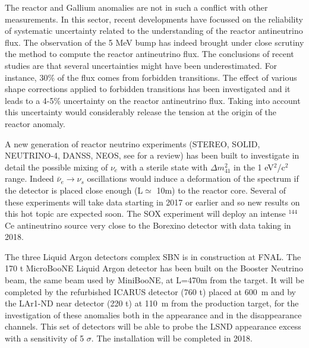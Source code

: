 The reactor and Gallium anomalies are not in such a conflict with other measurements. In this sector, recent developments have focussed on the reliability of systematic uncertainty related to the understanding of the reactor antineutrino flux. The observation of the 5 MeV bump has indeed brought under close scrutiny the method to compute the reactor antineutrino flux. The conclusions of recent studies \cite{hayes,vogel} are that several uncertainties might have been underestimated. For instance, 30\% of the flux comes from forbidden transitions. The effect of various shape corrections applied to forbidden transitions has been investigated and it leads to a 4-5\% uncertainty on the reactor antineutrino flux. Taking into account this uncertainty would considerably release the tension at the origin of the reactor anomaly.

A new generation of reactor neutrino experiments (STEREO, SOLID, NEUTRINO-4, DANSS, NEOS, see \cite{othervsbl} for a review) has been built to investigate in detail the possible mixing of $\nu_e$ with a sterile state with $\Delta m^2_{41}$ in the 1 eV$^2$/c$^2$ range.
Indeed $\bar{\nu}_e \rightarrow \nu_s$ oscillations would induce a deformation of the spectrum if the detector is placed close enough (L$\simeq$ 10m) to the reactor core. Several of these experiments will take data starting in 2017 or earlier and so new results on this hot topic are expected soon.
The SOX experiment \cite{cribier} will deploy an intense $^{144}$Ce antineutrino source very close to the Borexino detector with data taking in 2018.

The three Liquid Argon detectors complex SBN \cite{sbnfnal} is in construction at FNAL. The 170 t MicroBooNE Liquid Argon detector has been built on the Booster Neutrino beam, the same beam used by MiniBooNE, at L=470m from the target. It will be completed by the refurbished ICARUS detector (760 t) placed at 600~m and by the LAr1-ND near detector (220 t)  at 110~m from the production target, for the investigation of these anomalies both in the appearance and in the disappearance channels. This set of detectors will be able to probe the LSND appearance excess with a sensitivity of 5 $\sigma$. The installation will be completed in 2018.    

